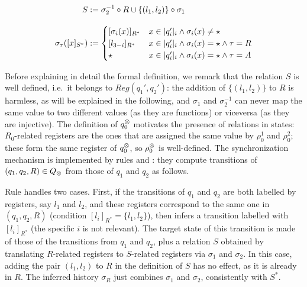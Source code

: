 \begin{definition}
	\begin{align*}
		S &:= \sigma_2^{-1} \circ R \cup \{(l_1,l_2)\} \circ \sigma_1 
		\\[2ex]
		\sigma_\tau([x]_{S^*}) &:= 
		\begin{cases}
			[\sigma_i(x)]_{R^*} & x \in |q'_i|_i \land \sigma_i(x) \neq \star \\
			[l_{3-i}]_{R^*} & x \in |q'_i|_i \land \sigma_i(x) = \star \land \tau = R \\
			\star & x \in |q'_i|_i \land \sigma_i(x) = \star \land \tau = A
		\end{cases}
	\end{align*}
\end{definition}
%
 Before explaining in detail the formal definition, we remark that the relation $S$ is well defined, i.e.\ it belongs to $Reg(q_1',q_2')$: the addition of $\{(l_1,l_2)\}$ to $R$ is harmless, as will be explained in the following, and $\sigma_1$ and $\sigma^{-1}_2$ can never map the same value to two different values (as they are functions) or viceversa (as they are injective).
%
The definition of $q_0^{\otimes}$ motivates the presence of relations in states: $R_0$-related registers are the ones that are assigned the same value by $\rho_0^1$ and $\rho_0^2$; these form the same register of $q_0^{\otimes}$, so $\rho_0^{\otimes}$ is well-defined. The synchronization mechanism is implemented by rules \regrule{} and \allrule{}: they compute transitions of $(q_1,q_2,R) \in Q_{\otimes}$ from those of $q_1$ and $q_2$ as follows.

 Rule \regrule{} handles two cases. First, if the transitions of $q_1$ and $q_2$ are both labelled by registers, say $l_1$ and $l_2$, and these registers correspond to the same one in $(q_1,q_2,R)$ (condition $[l_i]_{R^*} = \{l_1,l_2\}$), then \regrule{} infers a transition labelled with $[l_i]_{R^*}$ (the specific $i$ is not relevant). The target state of this transition is made of those of the transitions from $q_1$ and $q_2$, plus a relation $S$ obtained by translating $R$-related registers to $S$-related registers via $\sigma_1$ and $\sigma_2$. In this case, adding the pair $(l_1,l_2)$ to $R$ in the definition of $S$ has no effect, as it is already in $R$. The inferred history $\sigma_R$ just combines $\sigma_1$ and $\sigma_2$, consistently with $S^*$.

